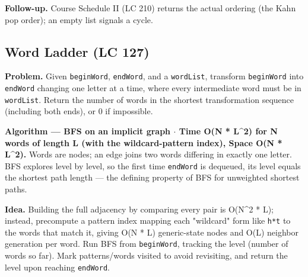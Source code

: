 \documentclass[11pt]{article}
\begin{document}
\textbf{Follow-up.} Course Schedule II (LC 210) returns the actual ordering (the Kahn pop order); an empty list signals a cycle.

\subsection{Word Ladder (LC 127)}\label{word-ladder-lc-127}

\textbf{Problem.} Given \texttt{beginWord}, \texttt{endWord}, and a \texttt{wordList}, transform \texttt{beginWord} into \texttt{endWord} changing one letter at a time, where every intermediate word must be in \texttt{wordList}. Return the number of words in the shortest transformation sequence (including both ends), or 0 if impossible.

\textbf{Algorithm --- BFS on an implicit graph \(\cdot\) Time O(N * L\^{}2) for N words of length L (with the wildcard-pattern index), Space O(N * L\^{}2).} Words are nodes; an edge joins two words differing in exactly one letter. BFS explores level by level, so the first time \texttt{endWord} is dequeued, its level equals the shortest path length --- the defining property of BFS for unweighted shortest paths.

\textbf{Idea.} Building the full adjacency by comparing every pair is O(N\^{}2 * L); instead, precompute a pattern index mapping each "wildcard" form like \texttt{h*t} to the words that match it, giving O(N * L) generic-state nodes and O(L) neighbor generation per word. Run BFS from \texttt{beginWord}, tracking the level (number of words so far). Mark patterns/words visited to avoid revisiting, and return the level upon reaching \texttt{endWord}.

\end{document}
